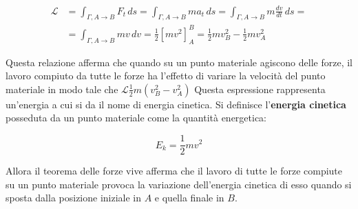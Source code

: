 \begin{equation*}
	\begin{aligned}
		\mathcal{L} &= \int_{\Gamma, A\to B} F_t\,ds=\int_{\Gamma, A\to B} ma_t\,ds=\int_{\Gamma, A\to B} m\frac{dv}{dt}\,ds= \\
		&= \int_{\Gamma, A\to B} mv\,dv=\frac{1}{2}[ mv^2 ]^B_A=\frac{1}{2}mv^2_B-\frac{1}{2}mv^2_A
	\end{aligned}
\end{equation*}

Questa relazione afferma che quando su un punto materiale agiscono delle forze, il lavoro compiuto da tutte le forze ha l'effetto di variare la velocità del punto materiale in modo tale che $\mathcal{L} \frac{1}{2}m(v^2_B-v^2_A)$
Questa espressione rappresenta un'energia a cui si da il nome di energia cinetica. Si definisce l'\textbf{energia cinetica} posseduta da un punto materiale come la quantità energetica:

\[
	\boxed{E_k=\frac{1}{2}mv^2}
\]

Allora il teorema delle forze vive afferma che il lavoro di tutte le forze compiute su un punto materiale provoca la variazione dell'energia cinetica di esso quando si sposta dalla posizione iniziale in $A$ e quella finale in $B$. 

